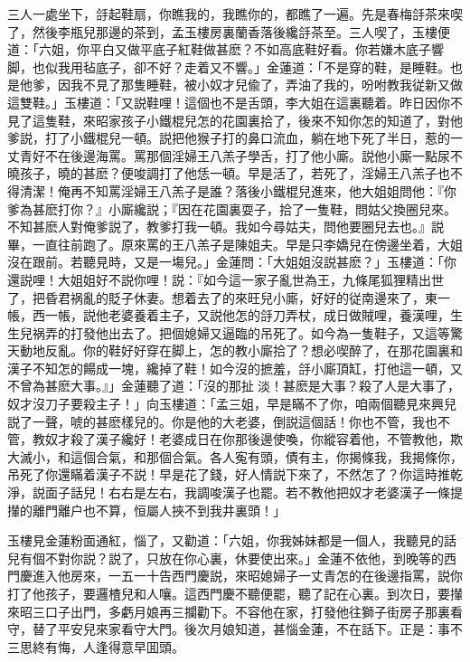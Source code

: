 三人一處坐下，㧱起鞋扇，你瞧我的，我瞧你的，都瞧了一遍。先是春梅㧱茶來喫了，然後李瓶兒那邊的茶到，孟玉樓房裏蘭香落後纔㧱茶至。三人喫了，玉樓便道：「六姐，你平白又做平底子紅鞋做甚麽？不如高底鞋好看。你若嫌木底子響脚，也似我用毡底子，卻不好？走着又不響。」金蓮道：「不是穿的鞋，是睡鞋。也是他爹，因我不見了那隻睡鞋，被小奴才兒偸了，弄油了我的，吩咐教我従新又做這雙鞋。」玉樓道：「又説鞋哩！這個也不是舌頭，李大姐在這裏聽着。昨日因你不見了這隻鞋，來昭家孩子小鐵棍兒怎的花園裏拾了，後來不知你怎的知道了，對他爹説，打了小鐵棍兒一頓。説把他猴子打的鼻口流血，躺在地下死了半日，惹的一丈青好不在後邊海罵。罵那個淫婦王八羔子學舌，打了他小廝。説他小廝一點尿不曉孩子，曉的甚麽？便唆調打了他恁一頓。早是活了，若死了，淫婦王八羔子也不得清潔！俺再不知罵淫婦王八羔子是誰？落後小鐵棍兒進來，他大姐姐問他：『你爹為甚麽打你？』小廝纔説；『因在花園裏耍子，拾了一隻鞋，問姑父換圈兒來。不知甚麽人對俺爹説了，教爹打我一頓。我如今尋姑夫，問他要圈兒去也。』説畢，一直往前跑了。原來罵的王八羔子是陳姐夫。早是只李嬌兒在傍邊坐着，大姐沒在跟前。若聽見時，又是一塲兒。」金蓮問：「大姐姐沒説甚麽？」玉樓道：「你還説哩！大姐姐好不説你哩！説：『如今這一家子亂世為王，九條尾狐狸精出世了，把昏君祸亂的貶子休妻。想着去了的來旺兒小廝，好好的従南邊來了，東一帳，西一帳，説他老婆養着主子，又説他怎的㧱刀弄杖，成日做賊哩，養漢哩，生生兒祸弄的打發他出去了。把個媳婦又逼臨的吊死了。如今為一隻鞋子，又這等驚天動地反亂。你的鞋好好穿在脚上，怎的教小廝拾了？想必喫醉了，在那花園裏和漢子不知怎的餳成一塊，纔掉了鞋！如今沒的摭羞，㧱小廝頂缸，打他這一頓，又不曾為甚麽大事。』」金蓮聽了道：「沒的那扯𣭈淡！甚麽是大事？殺了人是大事了，奴才沒刀子要殺主子！」向玉樓道：「孟三姐，早是瞞不了你，咱兩個聽見來興兒説了一聲，唬的甚麽樣兒的。你是他的大老婆，倒説這個話！你也不管，我也不管，教奴才殺了漢子纔好！老婆成日在你那後邊使喚，你縱容着他，不管教他，欺大滅小，和這個合氣，和那個合氣。各人寃有頭，債有主，你揭條我，我揭條你，吊死了你還瞞着漢子不説！早是花了錢，好人情説下來了，不然怎了？你這時推乾淨，説面子話兒！右右是左右，我調唆漢子也罷。若不教他把奴才老婆漢子一條提攆的離門離户也不算，恒屬人挾不到我井裏頭！」

玉樓見金蓮粉面通紅，惱了，又勸道：「六姐，你我姊妹都是一個人，我聽見的話兒有個不對你説？説了，只放在你心裏，休要使出來。」金蓮不依他，到晚等的西門慶進入他房來，一五一十告西門慶説，來昭媳婦子一丈青怎的在後邊指罵，説你打了他孩子，要邏楂兒和人嚷。這西門慶不聽便罷，聽了記在心裏。到次日，要攆來昭三口子出門，多虧月娘再三攔勸下。不容他在家，打發他往獅子街房子那裏看守，替了平安兒來家看守大門。後次月娘知道，甚惱金蓮，不在話下。正是：事不三思終有悔，人逢得意早囬頭。

